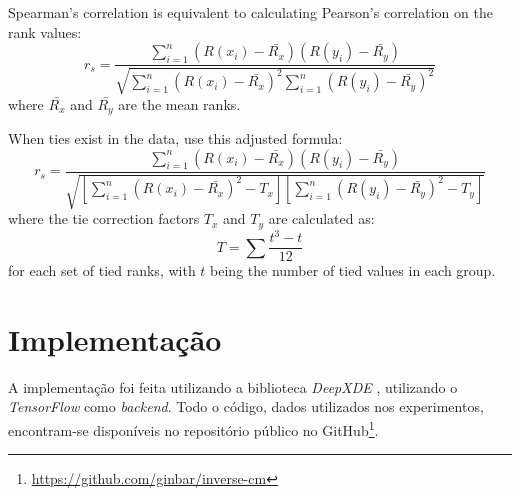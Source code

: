 Spearman's correlation is equivalent to calculating Pearson's correlation on the rank values:
\begin{equation}
r_s = \frac{\sum_{i=1}^{n} (R(x_i) - \bar{R_x})(R(y_i) - \bar{R_y})}{\sqrt{\sum_{i=1}^{n} (R(x_i) - \bar{R_x})^2 \sum_{i=1}^{n} (R(y_i) - \bar{R_y})^2}}
\end{equation}
where $\bar{R_x}$ and $\bar{R_y}$ are the mean ranks.

When ties exist in the data, use this adjusted formula:
\begin{equation}
r_s = \frac{\sum_{i=1}^{n} (R(x_i) - \bar{R_x})(R(y_i) - \bar{R_y})}{\sqrt{\left[\sum_{i=1}^{n} (R(x_i) - \bar{R_x})^2 - T_x\right]\left[\sum_{i=1}^{n} (R(y_i) - \bar{R_y})^2 - T_y\right]}}
\end{equation}
where the tie correction factors $T_x$ and $T_y$ are calculated as:
\begin{equation}
T = \sum \frac{t^3 - t}{12}
\end{equation}
for each set of tied ranks, with $t$ being the number of tied values in each group.


\section{Implementação}

A implementação foi feita utilizando a biblioteca \textit{DeepXDE} \cite{lu-etal:21-deepxde}, 
utilizando o \textit{TensorFlow} \cite{tensorflow:16} como \textit{backend}. 
Todo o código, dados utilizados nos experimentos,
encontram-se disponíveis no repositório público no 
GitHub\footnote{\url{https://github.com/ginbar/inverse-cm}}.

